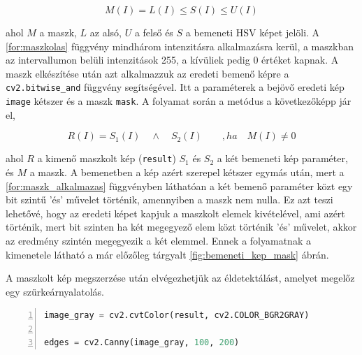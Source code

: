 \begin{equation}
    M(I) = L(I) \le S(I) \le U(I)
    \label{for:maszkolas}
\end{equation}

\par ahol $M$ a maszk, $L$ az alsó, $U$ a felső és $S$ a bemeneti HSV képet jelöli. A \ref{for:maszkolas} függvény mindhárom intenzitásra alkalmazásra kerül, a maszkban az intervallumon belüli intenzitások 255, a kívüliek pedig 0 értéket kapnak. A maszk elkészítése után azt alkalmazzuk az eredeti bemenő képre a \lstinline{cv2.bitwise_and} függvény \cite{cv2_bitwise_and} segítségével. Itt a paraméterek a bejövő eredeti kép \lstinline{image} kétszer és a maszk \lstinline{mask}.
\newline A folyamat során a metódus a következőképp jár el,

\begin{equation}
    R(I) = S_1(I)\quad \land\quad S_2(I)\qquad ,ha\quad M(I) \ne 0
    \label{for:maszk_alkalmazas}
\end{equation}

\par ahol $R$ a kimenő maszkolt kép (\lstinline{result}) $S_1$ és $S_2$ a két bemeneti kép paraméter, és $M$ a maszk. A bemenetben a kép azért szerepel kétszer egymás után, mert a \ref{for:maszk_alkalmazas} függvényben láthatóan a két bemenő paraméter közt egy bit szintű 'és' művelet történik, amennyiben a maszk nem nulla. Ez azt teszi lehetővé, hogy az eredeti képet kapjuk a maszkolt elemek kivételével, ami azért történik, mert bit szinten ha két megegyező elem közt történik 'és' művelet, akkor az eredmény szintén megegyezik a két elemmel. Ennek a folyamatnak a kimenetele látható a már előzőleg tárgyalt \ref{fig:bemeneti_kep_mask} ábrán.
\par A maszkolt kép megszerzése után elvégezhetjük az éldetektálást, amelyet megelőz egy szürkeárnyalatolás.

\vspace{2mm}
\hspace{-10mm}
\begin{minipage}{\linewidth}
\begin{lstlisting}[language=Python, numbers=left, caption={Szürkeárnyalatolás és éldetektálás.}, label={cod:gray_and_canny}]
image_gray = cv2.cvtColor(result, cv2.COLOR_BGR2GRAY)

edges = cv2.Canny(image_gray, 100, 200)
\end{lstlisting}
\end{minipage}

